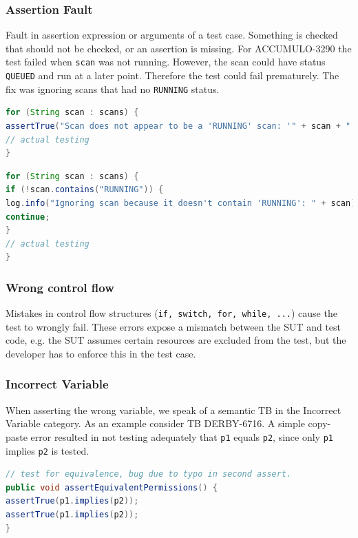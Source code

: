 \documentclass{uvamscse}
\begin{document}
\subsubsection{Assertion Fault}
Fault in assertion expression or arguments of a test case. Something is checked that should not be checked, or an assertion is missing. For ACCUMULO-3290 the test failed when \texttt{scan} was not running. However, the scan could have status \texttt{QUEUED} and run at a later point. Therefore the test could fail prematurely. The fix was ignoring scans that had no \texttt{RUNNING} status. 

\begin{lstlisting}[language=java, caption=Assertion fault (ACCUMULO-3290), label=Code_TB_assertion]
for (String scan : scans) {
assertTrue("Scan does not appear to be a 'RUNNING' scan: '" + scan + "'", scan.contains("RUNNING"));
// actual testing
}
\end{lstlisting}

\begin{lstlisting}[language=java, caption=Assertion fix (ACCUMULO-3290), label=Code_TB_assertion_fix]
for (String scan : scans) {
if (!scan.contains("RUNNING")) {
log.info("Ignoring scan because it doesn't contain 'RUNNING': " + scan);
continue;
}
// actual testing
}
\end{lstlisting}


\subsubsection{Wrong control flow}
Mistakes in control flow structures (\texttt{if, switch, for, while, ...}) cause the test to wrongly fail. These errors expose a mismatch between the SUT and test code, e.g. the SUT assumes certain resources are excluded from the test, but the developer has to enforce this in the test case.

\subsubsection{Incorrect Variable}
When asserting the wrong variable, we speak of a semantic TB in the Incorrect Variable category. As an example consider TB DERBY-6716. A simple copy-paste error resulted in not testing adequately that \texttt{p1} equals \texttt{p2}, since only \texttt{p1} implies \texttt{p2} is tested.

\begin{lstlisting}[language=java, caption=Asserting the wrong variable (DERBY-6716), label=Code_TB_WrongVariable]
// test for equivalence, bug due to typo in second assert.
public void assertEquivalentPermissions() {
assertTrue(p1.implies(p2));
assertTrue(p1.implies(p2));
}
\end{lstlisting}
\end{document}
